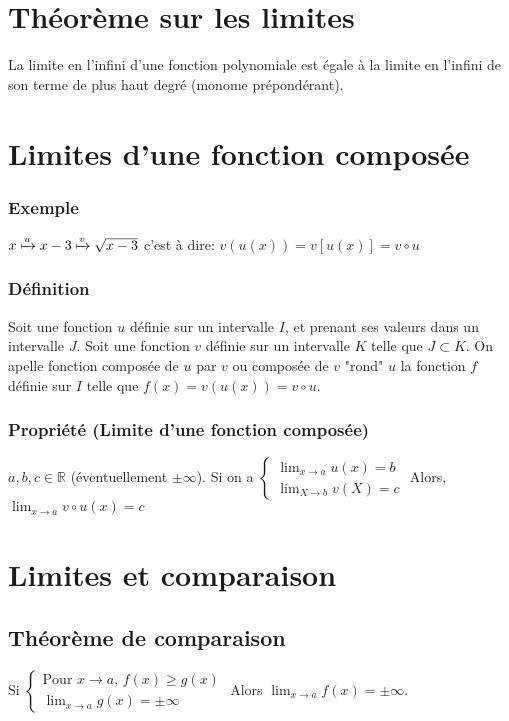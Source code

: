 \documentclass[9pt,twoside]{article}
\begin{document}
\section{Théorème sur les limites}
La limite en l'infini d'une fonction polynomiale est égale à la limite en l'infini de son terme de plus haut degré (monome prépondérant).

\section{Limites d'une fonction composée}
\subsubsection*{Exemple}
$x \xmapsto u x-3 \xmapsto v \sqrt{x-3}$  c'est à dire: $v(u(x))=v[u(x)]=v\circ u$
\subsubsection*{Définition}
Soit une fonction $u$ définie sur un intervalle $I$, et prenant ses valeurs dans un intervalle $J$. Soit une fonction $v$ définie sur un intervalle $K$ telle que $J\subset K$. On apelle fonction composée de $u$ par $v$ ou composée de $v$ "rond" $u$ la fonction $f$ définie sur $I$ telle que $f(x)=v(u(x))=v\circ u$.

\subsubsection*{Propriété (Limite d'une fonction composée)}

$a,b,c \in \mathbb{R}$ (éventuellement $\pm\infty$). Si on a $\begin{cases} \lim_{x\to a} u(x) =b\\ \lim_{X\to b} v(X)= c\end{cases}$ Alors, $\lim_{x\to a}v\circ u(x)= c$

\section{Limites et comparaison}
\subsection{Théorème de comparaison}
Si $\begin{cases} \text{Pour } x\to a\text{, }f(x)\geq g(x)\\ \lim_{x\to a} g(x) = \pm \infty\end{cases}$ Alors $\lim_{x\to a}f(x)=\pm\infty$.
\end{document}
